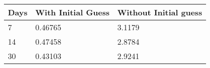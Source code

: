 \begin{tabular}{lll}
Days & With Initial Guess & Without Initial guess \\ 
\hline 
7 & 0.46765 & 3.1179 \\ 
14 & 0.47458 & 2.8784 \\ 
30 & 0.43103 & 2.9241 \\ 
\hline 
\end{tabular}